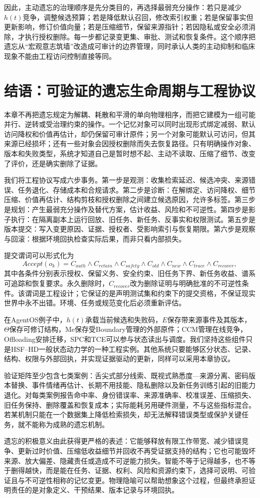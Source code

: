 因此，主动遗忘的治理顺序是先分类目的，再选择最弱充分操作：若只是减少$h(t)$竞争，调整候选预算；若是降低默认召回，修改索引权重；若是保留事实但更新影响，修订价值向量；若是压缩细节，保留来源指针；若因隐私或安全必须消除，才执行授权删除。每一步都记录变更集、审批、测试和恢复条件。这个顺序把遗忘从“宏观意志筑墙”改造成可审计的边界管理，同时承认人类的主动抑制和临床现象不能由工程访问控制直接等同。

\section{结语：可验证的遗忘生命周期与工程协议}
\label{sec:conclusion_of_forgetting}
本章不再把遗忘规定为解耦、耗散和平滑的单向物理相序，而把它建模为一组可能并行、逆转或受治理约束的操作。一个记忆对象可以同时出现形式绑定减弱、默认访问降权和价值再估计，却仍保留可审计原件；另一个对象可能默认可访问，但其来源已经损坏；还有一些对象会因授权删除而失去恢复路径。只有明确操作对象、版本和失败类型，系统才知道自己是暂时想不起、主动不读取、压缩了细节、改变了评价，还是确实删除了证据。

我们将工程协议写成六步事务。第一步是观测：收集检索延迟、候选冲突、来源错误、任务退化、存储成本和合规请求。第二步是诊断：在解绑定、访问降权、细节压缩、价值再估计、结构剪枝和授权删除之间建立候选原因，允许多标签。第三步是规划：产生最弱充分操作及替代方案，估计收益、风险和不可逆性。第四步是影子执行：在隔离副本上运行回放、旧任务、新任务、反事实和权限测试。第五步是版本提交：写入变更原因、证据、授权者、受影响索引与恢复期限。第六步是观察与回滚：根据环境回执检查实际后果，而非只看内部损失。

提交谓词可以形式化为
\[
Accept(o_k)=C_{auth}\land C_{retain}\land C_{safety}\land
C_{old}\land C_{new}\land C_{trace}\land C_{recover},
\]
其中各条件分别表示授权、保留义务、安全约束、旧任务下界、新任务收益、谱系可追踪和恢复要求。永久删除时，$C_{recover}$改为删除证明与明确批准的不可逆性条件。该谓词是工程设计；它保证的是声明测试集和约束下的提交资格，不保证现实世界中永不出错。环境、任务或规范变化后必须重新评估。

在AgentOS例子中，$h(t)$承载当前候选和失败码，$E$保存带来源事件及其版本，$\Theta$保存可修订结构，Me保存受Boundary管理的外部原件；CCM管理在线竞争，Offloading安排迁移，SPC和TCE可以参与状态读出与调度。我们坚持这些组件只是HSF--HD一般状态动力学的一种工程实例。其他系统只要能够区分状态、记录、结构、权限与外部回执，并实现证据驱动的更新，同样可以采用本章协议。

验证矩阵至少包含七类案例：舌尖式部分线索、既视式熟悉度—来源分离、密码版本替换、事件情绪再估计、长期不用技能、隐私删除以及新任务训练引起的旧能力退化。对每类案例报告命中率、身份错误率、来源准确率、校准误差、压缩损失、旧任务保持、删除覆盖和恢复成本；实际能耗另用硬件测量，不与这些指标混合。若某机制只能在一个数据集上降低检索损失，却无法解释错误类型或保护关键任务，就不能称为成熟的遗忘机制。

遗忘的积极意义由此获得更严格的表述：它能够释放有限工作带宽、减少错误竞争、更新过时价值、压缩低收益细节并回收不再受证据支持的结构；它也可能毁坏来源、放大偏差、隐藏责任或造成不可逆能力损失。智能不等于记得越多，也不等于删得越快，而是能在任务、证据、权利、风险和资源约束下，选择可说明、可验证且与不可逆性相称的记忆变更。物理隐喻可以帮助想象这个过程，但最终承担证明责任的是对象定义、干预结果、版本记录与环境回执。
